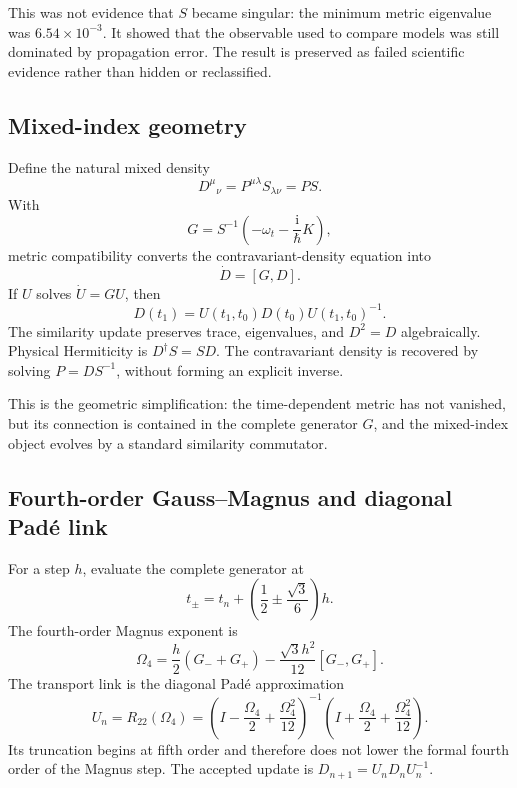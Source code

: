 \documentclass[11pt]{article}
\newcommand{\iu}{\mathrm{i}}
\begin{document}
This was not evidence that $S$ became singular: the minimum metric eigenvalue
was $6.54\times10^{-3}$.  It showed that the observable used to compare
models was still dominated by propagation error.  The result is preserved as
failed scientific evidence rather than hidden or reclassified.

\subsection{Mixed-index geometry}

Define the natural mixed density
\begin{equation}
 D^\mu{}_{\nu}=P^{\mu\lambda}S_{\lambda\nu}=PS.
\end{equation}
With
\begin{equation}
 G=S^{-1}\left(-\omega_t-\frac{\iu}{\hbar}K\right),
\end{equation}
metric compatibility converts the contravariant-density equation into
\begin{equation}
 \boxed{\dot D=[G,D].}
\end{equation}
If $U$ solves $\dot U=GU$, then
\begin{equation}
 D(t_1)=U(t_1,t_0)D(t_0)U(t_1,t_0)^{-1}.
\end{equation}
The similarity update preserves trace, eigenvalues, and $D^2=D$
algebraically.  Physical Hermiticity is $D^\dagger S=SD$.  The contravariant
density is recovered by solving $P=DS^{-1}$, without forming an explicit
inverse.

This is the geometric simplification: the time-dependent metric has not
vanished, but its connection is contained in the complete generator $G$, and
the mixed-index object evolves by a standard similarity commutator.

\subsection{Fourth-order Gauss--Magnus and diagonal Pad\'e link}

For a step $h$, evaluate the complete generator at
\begin{equation}
 t_\pm=t_n+\left(\frac12\pm\frac{\sqrt3}{6}\right)h.
\end{equation}
The fourth-order Magnus exponent is
\begin{equation}
 \Omega_4=\frac h2(G_-+G_+)
 -\frac{\sqrt3h^2}{12}[G_-,G_+].
\end{equation}
The transport link is the diagonal Pad\'e approximation
\begin{equation}
 U_n=R_{22}(\Omega_4)
 =\left(I-\frac{\Omega_4}{2}+\frac{\Omega_4^2}{12}\right)^{-1}
  \left(I+\frac{\Omega_4}{2}+\frac{\Omega_4^2}{12}\right).
\end{equation}
Its truncation begins at fifth order and therefore does not lower the formal
fourth order of the Magnus step.  The accepted update is
$D_{n+1}=U_nD_nU_n^{-1}$.
\end{document}
